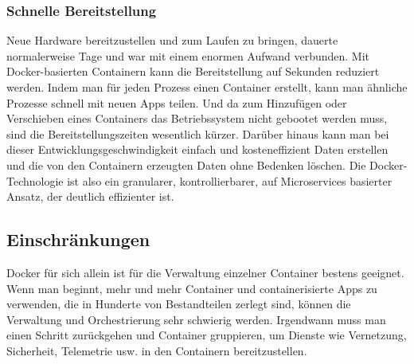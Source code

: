 \subsubsection{Schnelle Bereitstellung}

Neue Hardware bereitzustellen und zum Laufen zu bringen, dauerte normalerweise Tage und war mit einem enormen Aufwand verbunden. Mit Docker-basierten Containern kann die Bereitstellung auf Sekunden reduziert werden. 
Indem man für jeden Prozess einen Container erstellt, kann man ähnliche Prozesse schnell mit neuen Apps teilen. Und da zum Hinzufügen oder Verschieben eines Containers das 
Betriebssystem nicht gebootet werden muss, sind die Bereitstellungszeiten wesentlich kürzer. Darüber hinaus kann man bei dieser Entwicklungsgeschwindigkeit 
einfach und kosteneffizient Daten erstellen und die von den Containern erzeugten Daten ohne Bedenken löschen.
Die Docker-Technologie ist also ein granularer, kontrollierbarer, auf Microservices basierter Ansatz, der deutlich effizienter ist.
\cite{sysarch-docker-1}

\subsection{Einschränkungen}

Docker für sich allein ist für die Verwaltung einzelner Container bestens geeignet. Wenn man beginnt, mehr und mehr Container und containerisierte Apps zu verwenden, 
die in Hunderte von Bestandteilen zerlegt sind, können die Verwaltung und Orchestrierung sehr schwierig werden. Irgendwann muss man einen Schritt zurückgehen und Container gruppieren, 
um Dienste wie Vernetzung, Sicherheit, Telemetrie usw. in den Containern bereitzustellen.
\cite{sysarch-docker-1}